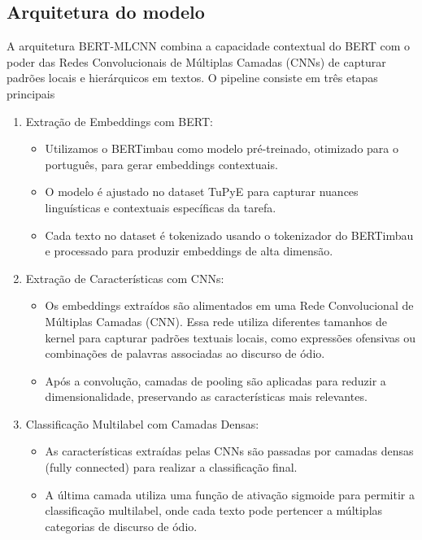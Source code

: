 \documentclass[sigconf,nonacm]{acmart}
\begin{document}
\subsection{Arquitetura do modelo}
A arquitetura BERT-MLCNN combina a capacidade contextual do BERT com o poder das Redes Convolucionais de Múltiplas Camadas (CNNs) 
de capturar padrões locais e hierárquicos em textos. O pipeline consiste em três etapas principais

\begin{enumerate}
  \item Extração de Embeddings com BERT: 
  \begin{itemize}
    \item Utilizamos o BERTimbau \cite{souza2020bertimbau} como modelo pré-treinado, otimizado para o português, para gerar embeddings contextuais. 
    \item O modelo é ajustado no dataset TuPyE \cite{oliveira2023tupye} para capturar nuances linguísticas e contextuais específicas da tarefa.
    \item Cada texto no dataset é tokenizado usando o tokenizador do BERTimbau e processado para produzir embeddings de alta dimensão.  
  \end{itemize}

  \item Extração de Características com CNNs:
  \begin{itemize}
    \item Os embeddings extraídos são alimentados em uma Rede Convolucional de Múltiplas Camadas (CNN). 
    Essa rede utiliza diferentes tamanhos de kernel para capturar padrões textuais locais, como expressões ofensivas ou combinações de palavras 
    associadas ao discurso de ódio.
    \item Após a convolução, camadas de pooling são aplicadas para reduzir a dimensionalidade, preservando as características mais relevantes.
  \end{itemize}

  \item Classificação Multilabel com Camadas Densas:
  \begin{itemize}
    \item As características extraídas pelas CNNs são passadas por camadas densas (fully connected) para realizar a classificação final.
    \item A última camada utiliza uma função de ativação sigmoide para permitir a classificação multilabel, onde cada texto pode pertencer 
    a múltiplas categorias de discurso de ódio.
  \end{itemize}


\end{enumerate}
\end{document}
